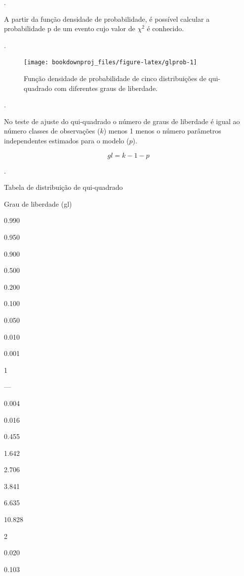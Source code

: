 \documentclass[
]{book}
\begin{document}
.\linebreak

A partir da função densidade de probabilidade, é possível calcular a probabilidade p de um evento cujo valor de \(\chi^2\) é conhecido.

.\linebreak

\begin{figure}

{\centering \texttt{[image: bookdownproj\_files/figure-latex/glprob-1]} 

}

\caption{Função densidade de probabilidade de cinco distribuições de qui-quadrado com diferentes graus de liberdade.}\label{fig:glprob}
\end{figure}

.\linebreak

No teste de ajuste do qui-quadrado o número de graus de liberdade é igual ao número classes de observações (\(k\)) menos 1 menos o número parâmetros independentes estimados para o modelo (\(p\)).

\begin{equation} 
gl=k-1-p
  \label{eq:gl}
\end{equation}

.\linebreak

\label{tab:unnamed-chunk-1}Tabela de distribuição de qui-quadrado

Grau de liberdade (gl)

0.990

0.950

0.900

0.500

0.200

0.100

0.050

0.010

0.001

1

---

0.004

0.016

0.455

1.642

2.706

3.841

6.635

10.828

2

0.020

0.103
\end{document}
